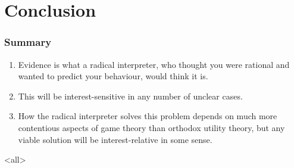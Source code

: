 \section{Conclusion}
\label{conclusion}

\begin{frame}

\frametitle{Summary}
\label{summary}

\begin{enumerate}
\item Evidence is what a radical interpreter, who thought you were rational and wanted to predict your behaviour, would think it is.

\item This will be interest-sensitive in any number of unclear cases.

\item How the radical interpreter solves this problem depends on much more contentious aspects of game theory than orthodox utility theory, but any viable solution will be interest-relative in some sense.

\end{enumerate}

\end{frame}

\mode<all>


\mode*
